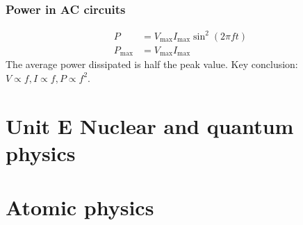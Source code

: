 \documentclass[a4paper,12pt]{article}
\begin{document}
\subsubsection*{Power in AC circuits}
$$\begin{aligned}P&=V_\text{max}I_\text{max}\sin^2(2\pi ft)\\P_\text{max}&=V_\text{max}I_\text{max}\end{aligned}$$
The average power dissipated is half the peak value. Key conclusion: $V\propto f, I\propto f, P\propto f^2$.
\newpage
\section*{Unit E Nuclear and quantum physics}

\section{Atomic physics}
\end{document}
